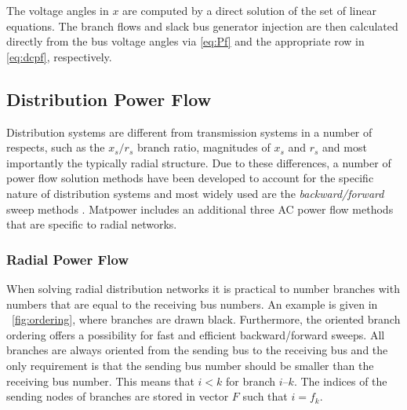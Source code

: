 \documentclass[12pt]{article}
\newcommand{\matpower}[0]{{\sc Matpower}}
\numberwithin{equation}{section}
\numberwithin{table}{section}
\numberwithin{figure}{section}
\begin{document}
The voltage angles in $x$ are computed by a direct solution of the set of linear equations. The branch flows and slack bus generator injection are then calculated directly from the bus voltage angles via \eqref{eq:Pf} and the appropriate row in \eqref{eq:dcpf}, respectively.

\subsection{Distribution Power Flow}
\label{sec:pfdist}

Distribution systems are different from transmission systems in a number of respects, such as the $x_s/r_s$ branch ratio, magnitudes of $x_s$ and $r_s$ and most importantly the typically radial structure. Due to these differences, a number of power flow solution methods have been developed to account for the specific nature of distribution systems and most widely used are the \textit{backward/forward} sweep methods \cite{shirmohammadi1988,luo1990}.
\matpower{} includes an additional three AC power flow methods that are specific to radial networks.

\subsubsection{Radial Power Flow}
When solving radial distribution networks it is practical to number bran\-ches with numbers that are equal to the receiving bus numbers. An example is given in \figurename~\ref{fig:ordering}, where branches are drawn black. Furthermore, the oriented branch ordering \cite{rajicic1994} offers a possibility for fast and efficient backward/forward sweeps. All branches are always oriented from the sending bus to the receiving bus and the only requirement is that the sending bus number should be smaller than the receiving bus number. This means that ${i < k}$ for branch $i$--$k$. The indices of the sending nodes of branches are stored in vector $F$ such that $i = f_k$.
\end{document}
